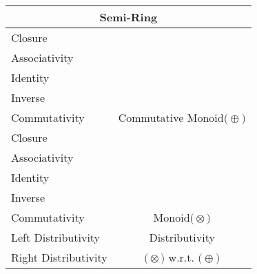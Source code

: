 \documentclass[a4paper,12pt]{scrartcl}    %
\newcommand{\OpA}{\otimes}
\newcommand{\OpB}{\oplus}
\begin{document}
\begin{minipage}[c]{0,5\textwidth}
\vspace{0.6cm}
\begin{tabular}{|l|c|} %
  \hline
  \multicolumn{2}{c}{\cellcolor{green!25}Semi-Ring} \\
  \hline
    \cellcolor{blue!25} Closure& \cellcolor{yellow!25}  \\
    \cellcolor{blue!25} Associativity& \cellcolor{yellow!25}  \\
    \cellcolor{blue!25} Identity& \cellcolor{yellow!25} \\
    \cellcolor{red!25} Inverse& \cellcolor{yellow!25} \\
    \cellcolor{blue!25} Commutativity& \multirow{-5}{*}{\tiny\cellcolor{yellow!25}Commutative Monoid$\big(\OpB\big)$} \\
   \hline
    \cellcolor{blue!25} Closure& \cellcolor{yellow!25}  \\
    \cellcolor{blue!25} Associativity& \cellcolor{yellow!25}  \\
    \cellcolor{blue!25} Identity& \cellcolor{yellow!25} \\
    \cellcolor{red!25} Inverse& \cellcolor{yellow!25} \\
    \cellcolor{red!25} Commutativity& \multirow{-5}{*}{\tiny\cellcolor{yellow!25}Monoid$\big(\OpA\big)$} \\
  \hline
  	\cellcolor{blue!25} Left Distributivity&  \tiny\cellcolor{yellow!25}Distributivity\\
    \cellcolor{blue!25} Right Distributivity & \tiny\cellcolor{yellow!25} $\big(\OpA\big)$ w.r.t. $\big(\OpB\big)$  \\
   \hline
\end{tabular}


\end{minipage}
\end{document}
